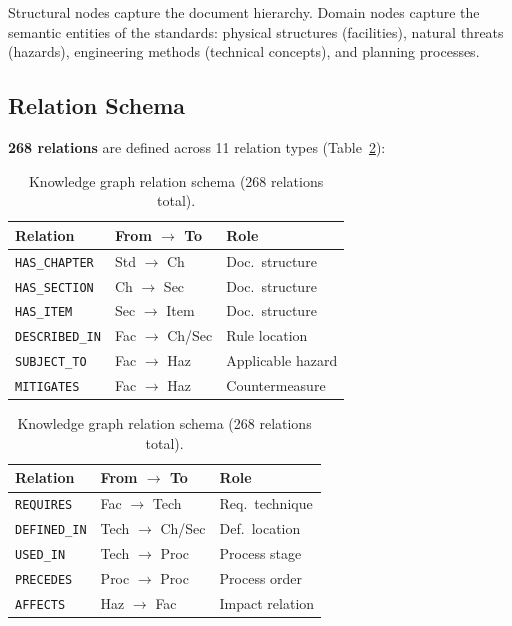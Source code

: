 \documentclass[twocolumn]{article}
\begin{document}
Structural nodes capture the document hierarchy.
Domain nodes capture the semantic entities of the standards: physical structures (facilities),
natural threats (hazards), engineering methods (technical concepts), and planning processes.

\subsection{Relation Schema}

\textbf{268 relations} are defined across 11 relation types (Table~\ref{tab:relations}):

\begin{table}[t]
  \centering
  \caption{Knowledge graph relation schema (268 relations total).}
  \label{tab:relations}
  \begin{minipage}[t]{0.48\linewidth}
    \centering
    \begin{tabular}{lll}
      \toprule
      Relation & From $\to$ To & Role \\
      \midrule
      \texttt{HAS\_CHAPTER}  & Std $\to$ Ch      & Doc.\ structure \\
      \texttt{HAS\_SECTION}  & Ch $\to$ Sec      & Doc.\ structure \\
      \texttt{HAS\_ITEM}     & Sec $\to$ Item    & Doc.\ structure \\
      \texttt{DESCRIBED\_IN} & Fac $\to$ Ch/Sec  & Rule location \\
      \texttt{SUBJECT\_TO}   & Fac $\to$ Haz     & Applicable hazard \\
      \texttt{MITIGATES}     & Fac $\to$ Haz     & Countermeasure \\
      \bottomrule
    \end{tabular}
  \end{minipage}
  \hfill
  \begin{minipage}[t]{0.48\linewidth}
    \centering
    \begin{tabular}{lll}
      \toprule
      Relation & From $\to$ To & Role \\
      \midrule
      \texttt{REQUIRES}   & Fac $\to$ Tech      & Req.\ technique \\
      \texttt{DEFINED\_IN}& Tech $\to$ Ch/Sec   & Def.\ location \\
      \texttt{USED\_IN}   & Tech $\to$ Proc     & Process stage \\
      \texttt{PRECEDES}   & Proc $\to$ Proc     & Process order \\
      \texttt{AFFECTS}    & Haz $\to$ Fac       & Impact relation \\
      \bottomrule
    \end{tabular}
  \end{minipage}
\end{table}
\end{document}

